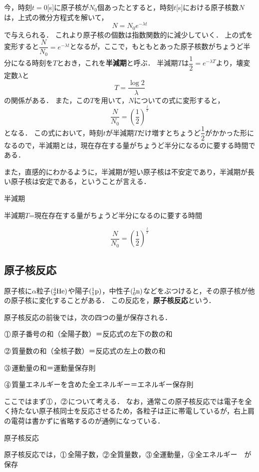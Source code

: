 今，時刻$t=0$[s]に原子核が$N_0$個あったとすると，時刻$t$[s]における原子核数$N$は，上式の微分方程式を解いて，
$$N=N_0e^{-\lambda t}$$
で与えられる．
これより原子核の個数は指数関数的に減少していく．
上の式を変形すると$\dfrac{N}{N_0}=e^{-\lambda t}$となるが，ここで，もともとあった原子核数がちょうど半分になる時刻を$T$とおき，これを{\bf 半減期}と呼ぶ．
半減期$T$は$\dfrac{1}{2}=e^{-\lambda T}$より，壊変定数$\lambda$と
$$T=\dfrac{\log 2}{\lambda}$$
の関係がある．
また，この$T$を用いて，$N$についての式に変形すると，
$$\dfrac{N}{N_0}=\left( \dfrac{1}{2} \right)^{\frac{t}{T}}$$
となる．
この式において，時刻$t$が半減期$T$だけ増すとちょうど$\dfrac{1}{2}$がかかった形になるので，半減期とは，現在存在する量がちょうど半分になるのに要する時間である．

また，直感的にわかるように，半減期が短い原子核は不安定であり，半減期が長い原子核は安定である，ということが言える．

\begin{matome}{半減期}

半減期$T$=現在存在する量がちょうど半分になるのに要する時間

$$\dfrac{N}{N_0}=\left( \dfrac{1}{2} \right)^{\frac{t}{T}}$$

 \end{matome}
 
\subsection{原子核反応}
 
原子核に$\alpha$粒子$({\rm ^4_2 He})$や陽子$({\rm ^1_1 p})$，中性子$({\rm ^1_0 n})$などをぶつけると，その原子核が他の原子核に変化することがある．
この反応を，{\bf 原子核反応}という．

原子核反応の前後では，次の四つの量が保存される．

$\MARU{1}$原子番号の和（全陽子数）＝反応式の左下の数の和

$\MARU{2}$質量数の和（全核子数）＝反応式の左上の数の和

$\MARU{3}$運動量の和＝運動量保存則

$\MARU{4}$質量エネルギーを含めた全エネルギー＝エネルギー保存則

ここではまず$\MARU{1}$，$\MARU{2}$について考える．
なお，通常この原子核反応では電子を全く持たない原子核同士を反応させるため，各粒子は正に帯電しているが，右上肩の電荷は書かずに省略するのが通例になっている．

\begin{matome}{原子核反応}

原子核反応では，$\MARU{1}$全陽子数，$\MARU{2}$全質量数，$\MARU{3}$全運動量，$\MARU{4}$全エネルギー　が保存

 \end{matome}

